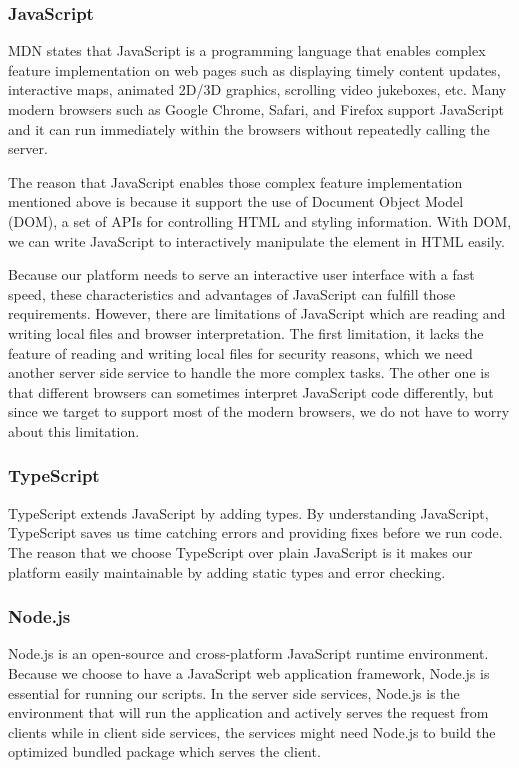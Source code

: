 \documentclass[12pt,oneside,openright,a4paper]{cpe-english-project}
\begin{document}
\subsubsection{JavaScript}

MDN \cite{JavaScript} states that JavaScript is a programming language that enables complex feature implementation on web pages such as displaying timely content updates, interactive maps, animated 2D/3D graphics, scrolling video jukeboxes, etc. Many modern browsers such as Google Chrome, Safari, and Firefox support JavaScript and it can run immediately within the browsers without repeatedly calling the server.

The reason that JavaScript enables those complex feature implementation mentioned above is because it support the use of Document Object Model (DOM), a set of APIs for controlling HTML and styling information. \cite{Manipulatingdocuments} With DOM, we can write JavaScript to interactively manipulate the element in HTML easily.

Because our platform needs to serve an interactive user interface with a fast speed, these characteristics and advantages of JavaScript can fulfill those requirements. However, there are limitations of JavaScript which are reading and writing local files and browser interpretation. The first limitation, it lacks the feature of reading and writing local files for security reasons, which we need another server side service to handle the more complex tasks. The other one is that different browsers can sometimes interpret JavaScript code differently, but since we target to support most of the modern browsers, we do not have to worry about this limitation.

\subsubsection{TypeScript}

TypeScript extends JavaScript by adding types. By understanding JavaScript, TypeScript saves us time catching errors and providing fixes before we run code. \cite{TypeScript} The reason that we choose TypeScript over plain JavaScript is it makes our platform easily maintainable by adding static types and error checking.

\subsubsection{Node.js}

Node.js is an open-source and cross-platform JavaScript runtime environment. \cite{IntroductiontoNodejs} Because we choose to have a JavaScript web application framework, Node.js is essential for running our scripts. In the server side services, Node.js is the environment that will run the application and actively serves the request from clients while in client side services, the services might need Node.js to build the optimized bundled package which serves the client.
\end{document}
